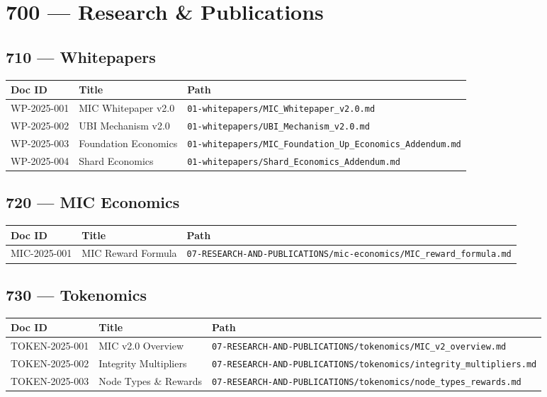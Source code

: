 \documentclass[11pt,a4paper]{article}
\begin{document}
\section{700 — Research \& Publications}

\subsection{710 — Whitepapers}

\begin{longtable}{p{2cm}p{8cm}p{3cm}}
\toprule
\textbf{Doc ID} & \textbf{Title} & \textbf{Path} \\
\midrule
WP-2025-001 & MIC Whitepaper v2.0 & \texttt{01-whitepapers/MIC\_Whitepaper\_v2.0.md} \\
WP-2025-002 & UBI Mechanism v2.0 & \texttt{01-whitepapers/UBI\_Mechanism\_v2.0.md} \\
WP-2025-003 & Foundation Economics & \texttt{01-whitepapers/MIC\_Foundation\_Up\_Economics\_Addendum.md} \\
WP-2025-004 & Shard Economics & \texttt{01-whitepapers/Shard\_Economics\_Addendum.md} \\
\bottomrule
\end{longtable}

\subsection{720 — MIC Economics}

\begin{longtable}{p{2cm}p{8cm}p{3cm}}
\toprule
\textbf{Doc ID} & \textbf{Title} & \textbf{Path} \\
\midrule
MIC-2025-001 & MIC Reward Formula & \texttt{07-RESEARCH-AND-PUBLICATIONS/mic-economics/MIC\_reward\_formula.md} \\
\bottomrule
\end{longtable}

\subsection{730 — Tokenomics}

\begin{longtable}{p{2cm}p{8cm}p{3cm}}
\toprule
\textbf{Doc ID} & \textbf{Title} & \textbf{Path} \\
\midrule
TOKEN-2025-001 & MIC v2.0 Overview & \texttt{07-RESEARCH-AND-PUBLICATIONS/tokenomics/MIC\_v2\_overview.md} \\
TOKEN-2025-002 & Integrity Multipliers & \texttt{07-RESEARCH-AND-PUBLICATIONS/tokenomics/integrity\_multipliers.md} \\
TOKEN-2025-003 & Node Types \& Rewards & \texttt{07-RESEARCH-AND-PUBLICATIONS/tokenomics/node\_types\_rewards.md} \\
\bottomrule
\end{longtable}
\end{document}
